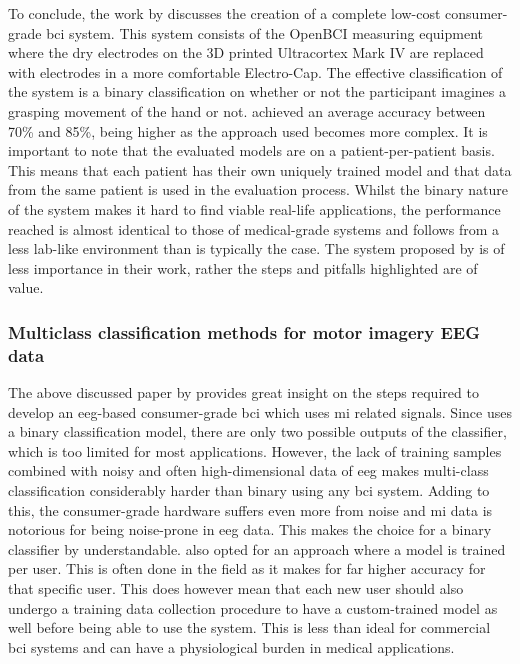 To conclude, the work by  discusses the creation of a complete low-cost consumer-grade \gls{bci} system.
This system consists of the OpenBCI measuring equipment where the dry electrodes on the 3D printed Ultracortex Mark IV are replaced with electrodes in a more comfortable Electro-Cap.
The effective classification of the system is a binary  classification on whether or not the participant imagines a grasping movement of the hand or not.
 achieved an average accuracy between 70\% and 85\%, being higher as the approach used becomes more complex.
It is important to note that the evaluated models are on a patient-per-patient basis.
This means that each patient has their own uniquely trained model and that data from the same patient is used in the evaluation process.
Whilst the binary nature of the system makes it hard to find viable real-life applications, the performance reached is almost identical to those of medical-grade systems and follows from a less lab-like environment than is typically the case.
The system proposed by  is of less importance in their work, rather the steps and pitfalls highlighted are of value.




\subsubsection{Multiclass classification methods for motor imagery EEG data}
\label{subsubsec:bci_small_projects_motivating_examples_mi_classification}

The above discussed paper by \citet{cheap_bci_feasibility} provides great insight on the steps required to develop an \gls{eeg}-based consumer-grade \gls{bci} which uses \gls{mi} related signals.
Since \citet{cheap_bci_feasibility} uses a binary classification model, there are only two possible outputs of the classifier, which is too limited for most applications.
However, the lack of training samples combined with noisy and often high-dimensional data of \gls{eeg} makes multi-class classification considerably harder than binary using any \gls{bci} system.
Adding to this, the consumer-grade hardware suffers even more from noise and \gls{mi} data is notorious for being noise-prone in \gls{eeg} data.
This makes the choice for a binary classifier by  understandable.
 also opted for an approach where a model is trained per user.
This is often done in the field as it makes for far higher accuracy for that specific user.
This does however mean that each new user should also undergo a training data collection procedure to have a custom-trained model as well before being able to use the system.
This is less than ideal for commercial \gls{bci} systems and can have a physiological burden in medical applications.

